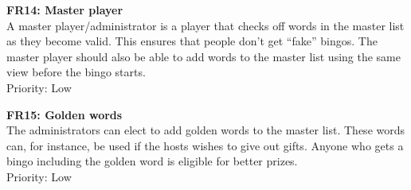{\bf FR14: Master player}\\
A master player/administrator is a player that checks off words in the master
list as they become valid. This ensures that people don't get ``fake'' bingos.
The master player should also be able to add words to the master list using
the same view before the bingo starts.\\
Priority: Low

{\bf FR15: Golden words}\\
The administrators can elect to add golden words to the master list. These
words can, for instance, be used if the hosts wishes to give out gifts. Anyone
who gets a bingo including the golden word is eligible for better prizes.\\
Priority: Low
